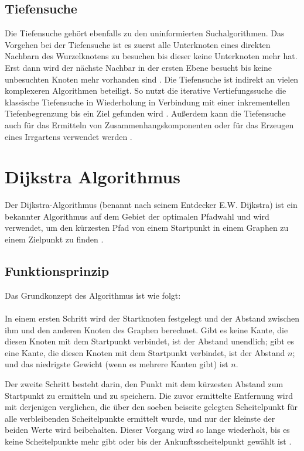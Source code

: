 \subsection{Tiefensuche}
\label{Tiefensuche}
Die Tiefensuche gehört ebenfalls zu den uninformierten Suchalgorithmen.
Das Vorgehen bei der Tiefensuche ist es zuerst alle Unterknoten eines direkten Nachbarn des Wurzelknotens zu besuchen bis dieser 
keine Unterknoten mehr hat.
Erst dann wird der nächste Nachbar in der ersten Ebene besucht bis keine unbesuchten Knoten mehr vorhanden sind \cite[85,86]{Russell:10}. 
Die Tiefensuche ist indirekt an vielen komplexeren Algorithmen beteiligt. 
So nutzt die iterative Vertiefungssuche die klassische Tiefensuche in Wiederholung in Verbindung mit einer inkrementellen 
Tiefenbegrenzung bis ein Ziel gefunden wird \cite[108,109]{Russell:10}.
Außerdem kann die Tiefensuche auch für das Ermitteln von Zusammenhangskomponenten
oder für das Erzeugen eines Irrgartens verwendet werden \cite[85,86]{Russell:10}.

\section{Dijkstra Algorithmus}
\label{Dijkstra Algorithmus}

Der Dijkstra-Algorithmus (benannt nach seinem Entdecker E.W. Dijkstra) ist ein bekannter Algorithmus auf dem Gebiet der optimalen
Pfadwahl und wird verwendet, um den kürzesten Pfad von einem Startpunkt in einem Graphen zu einem Zielpunkt zu finden \cite{Javaid2019}.

\subsection{Funktionsprinzip}

Das Grundkonzept des Algorithmus ist wie folgt:
\\ \\
In einem ersten Schritt wird der Startknoten festgelegt und der Abstand zwischen ihm und den anderen Knoten des Graphen berechnet. 
Gibt es keine Kante, die diesen Knoten mit dem Startpunkt verbindet, ist der Abstand unendlich; gibt es eine Kante, die 
diesen Knoten mit dem Startpunkt verbindet, ist der Abstand $n$; und das niedrigste Gewicht (wenn es mehrere Kanten gibt) ist $n$.

Der zweite Schritt besteht darin, den Punkt mit dem kürzesten Abstand zum Startpunkt zu ermitteln und zu speichern. Die zuvor ermittelte 
Entfernung wird mit derjenigen verglichen, die über den soeben beiseite gelegten Scheitelpunkt für alle verbleibenden Scheitelpunkte 
ermittelt wurde, und nur der kleinste der beiden Werte wird beibehalten. Dieser Vorgang wird so lange wiederholt, bis es keine Scheitelpunkte
mehr gibt oder bis der Ankunftsscheitelpunkt gewählt ist \cite{Zhou:19}.

